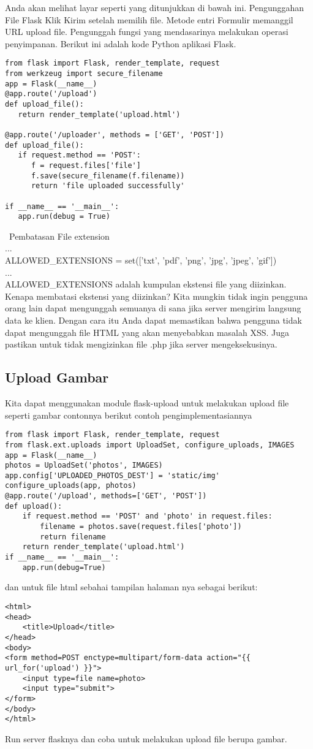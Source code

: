 \documentclass[12pt,a4paper]{article}
\begin{document}
Anda akan melihat layar seperti yang ditunjukkan di bawah ini. Pengunggahan File Flask Klik Kirim setelah memilih file. Metode entri Formulir memanggil URL upload file. Pengunggah fungsi yang mendasarinya melakukan operasi penyimpanan.
Berikut ini adalah kode Python aplikasi Flask.
\begin{verbatim}
from flask import Flask, render_template, request
from werkzeug import secure_filename
app = Flask(__name__)
@app.route('/upload')
def upload_file():
   return render_template('upload.html')
	
@app.route('/uploader', methods = ['GET', 'POST'])
def upload_file():
   if request.method == 'POST':
      f = request.files['file']
      f.save(secure_filename(f.filename))
      return 'file uploaded successfully'
		
if __name__ == '__main__':
   app.run(debug = True)
\end{verbatim}
\
Pembatasan File extension\\
...\\
ALLOWED\_EXTENSIONS = set(['txt', 'pdf', 'png', 'jpg', 'jpeg', 'gif'])\\
...\\
ALLOWED\_EXTENSIONS adalah kumpulan ekstensi file yang diizinkan. Kenapa membatasi ekstensi yang diizinkan? Kita mungkin tidak ingin pengguna orang lain dapat mengunggah semuanya di sana jika server mengirim langsung data ke klien. Dengan cara itu Anda dapat memastikan bahwa pengguna tidak dapat mengunggah file HTML yang akan menyebabkan masalah XSS. Juga pastikan untuk tidak mengizinkan file .php jika server mengeksekusinya.
\subsection{Upload Gambar}
Kita dapat menggunakan module flask-upload untuk melakukan upload file seperti gambar contonnya berikut contoh pengimplementasiannya
\begin{verbatim}
from flask import Flask, render_template, request
from flask.ext.uploads import UploadSet, configure_uploads, IMAGES
app = Flask(__name__)
photos = UploadSet('photos', IMAGES)
app.config['UPLOADED_PHOTOS_DEST'] = 'static/img'
configure_uploads(app, photos)
@app.route('/upload', methods=['GET', 'POST'])
def upload():
    if request.method == 'POST' and 'photo' in request.files:
        filename = photos.save(request.files['photo'])
        return filename
    return render_template('upload.html')
if __name__ == '__main__':
    app.run(debug=True)
\end{verbatim}
dan untuk file html sebahai tampilan halaman nya sebagai berikut:
\begin{verbatim}
<html>
<head>
    <title>Upload</title>
</head>
<body>
<form method=POST enctype=multipart/form-data action="{{ url_for('upload') }}">
    <input type=file name=photo>
    <input type="submit">
</form>
</body>
</html>
\end{verbatim}
Run server flasknya dan coba untuk melakukan upload file berupa gambar.
\end{document}
